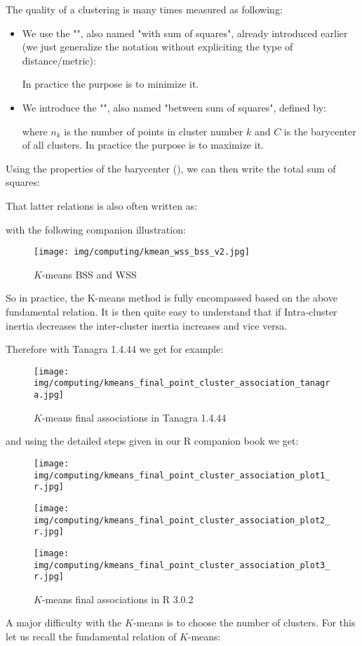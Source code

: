 	The quality of a clustering is many times measured as following:
	\begin{itemize}
		\item We use the "", also named "with sum of squares", already introduced earlier (we just generalize the notation without expliciting the type of distance/metric):
		
		In practice the purpose is to minimize it.
	
		\item We introduce the "", also named "between sum of squares", defined by:
		
		where $n_k$ is the number of points in cluster number $k$ and $C$ is the barycenter of all clusters. In practice the purpose is to maximize it.
	\end{itemize}
	Using the properties of the barycenter (), we can then write the total sum of squares:
	
	That latter relations is also often written as:
	
	with the following companion illustration:
	\begin{figure}[H]
		\centering
		\texttt{[image: img/computing/kmean\_wss\_bss\_v2.jpg]}
		\caption[]{$K$-means BSS and WSS}
	\end{figure}
	So in practice, the K-means method is fully encompassed based on the above fundamental relation. It is then quite easy to understand that if Intra-cluster inertia decreases the inter-cluster inertia increases and vice versa.
	
	Therefore with Tanagra 1.4.44 we get for example:
	\begin{figure}[H]
		\centering
		\texttt{[image: img/computing/kmeans\_final\_point\_cluster\_association\_tanagra.jpg]}
		\caption[]{$K$-means final associations in Tanagra 1.4.44}
	\end{figure}
	and using the detailed steps given in our R companion book we get:
	\begin{figure}[H]
		\centering
		\texttt{[image: img/computing/kmeans\_final\_point\_cluster\_association\_plot1\_r.jpg]}
	\end{figure}
	\begin{figure}[H]
		\centering
		\texttt{[image: img/computing/kmeans\_final\_point\_cluster\_association\_plot2\_r.jpg]}
	\end{figure}
	\begin{figure}[H]
		\centering
		\texttt{[image: img/computing/kmeans\_final\_point\_cluster\_association\_plot3\_r.jpg]}
		\caption[]{$K$-means final associations in R 3.0.2}
	\end{figure}
	A major difficulty with the $K$-means is to choose the number of clusters. For this let us recall the fundamental relation of $K$-means:
	
